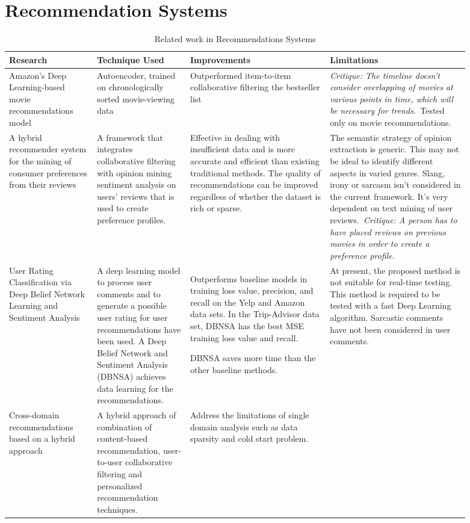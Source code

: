 \documentclass[a4paper, 12pt, oneside]{report}
\begin{document}
\section{Recommendation Systems}
\begin{longtable}{|p{0.17\linewidth}|p{0.18\linewidth}|p{0.27\linewidth}|p{0.27\linewidth}|} 
\caption{Related work in Recommendations Systems}
\label{tab:related-work-table}\\
\hline
Research & Technique Used & Improvements & Limitations \\ 
\hline
Amazon's Deep Learning-based movie recommendations model \autocite{larry_history_2019} & Autoencoder, trained on chronologically sorted movie-viewing data & Outperformed item-to-item collaborative filtering  the bestseller list & \textit{Critique: The timeline doesn't consider overlapping of movies at various points in time, which will be necessary for trends.~}Tested only on movie recommendations. \\ 
\hline
A hybrid recommender system for the mining of consumer preferences from their reviews \autocite{cheng_hybrid_2020} & A framework that integrates collaborative filtering with opinion mining  sentiment analysis on users' reviews that is used to create preference profiles. & Effective in dealing with insufficient data and is more accurate and efficient than existing traditional methods. The quality of recommendations can be improved regardless of whether the dataset is rich or sparse. & The semantic strategy of opinion extraction is generic. This may not be ideal to identify different aspects in varied genres. Slang, irony or sarcasm isn't considered in the current framework. It's very dependent on text mining of user reviews.~\textit{Critique: A person has to have placed reviews on previous movies in order to create a preference profile.} \\
\hline
User Rating Classification via Deep Belief Network Learning and Sentiment Analysis \autocite{chen_user_2019} & A deep learning model to process user comments and to generate a possible user rating for user recommendations have been used. A Deep Belief Network and Sentiment Analysis (DBNSA) achieves data learning for the recommendations.~ & Outperforms baseline models in training loss value, precision, and recall on the Yelp and Amazon data sets. In the Trip-Advisor data set, DBNSA has the best MSE training loss value and recall.

DBNSA saves more time than the other baseline methods. & At present, the proposed method is not suitable for real-time testing. This method is required to be tested with a fast Deep Learning algorithm. Sarcastic comments have not been considered in user comments. \\ 
\hline
Cross-domain recommendations based on a hybrid approach \autocite{pes_universitydepartment_of_computer_science_bangalore_560085_india_cross-domain_2018} & A hybrid approach of combination of content-based recommendation, user-to-user collaborative filtering and personalized recommendation techniques. & Address the limitations of single domain analysis such as data sparsity and cold start problem.


\end{longtable}
\end{document}
